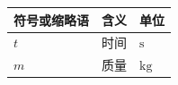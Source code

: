 \begin{center}
\begin{tabular}{lll}
  \toprule
  符号或缩略语 & 含义 & 单位 \\
  \midrule
  $t$ & 时间 & $\mathrm{s}$ \\
  $m$ & 质量 & $\mathrm{kg}$ \\
  \bottomrule
\end{tabular}
\end{center}
